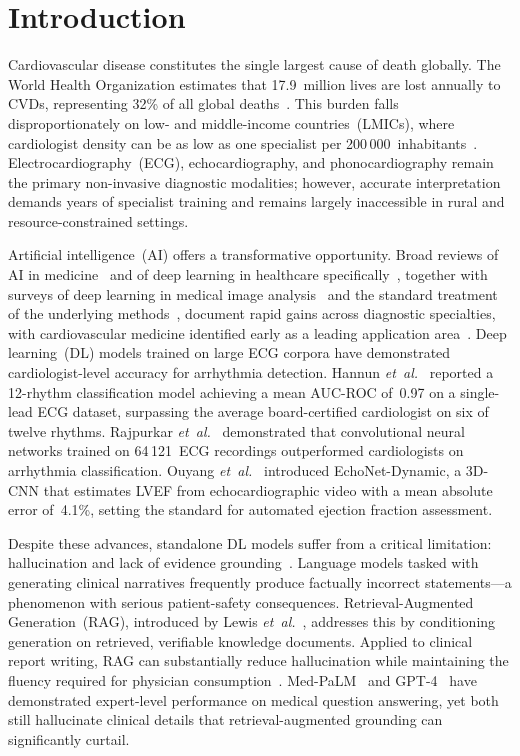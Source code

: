 \documentclass[AMA,STIX1COL,]{WileyNJD-v2}
\begin{document}
\section{Introduction}
\label{sec:intro}

Cardiovascular disease constitutes the single largest cause of death
globally. The World Health Organization estimates that
17.9~million lives are lost annually to CVDs, representing 32\% of all
global deaths~\cite{who2021}. This burden falls disproportionately on
low- and middle-income countries~(LMICs), where cardiologist density
can be as low as one specialist per 200\,000~inhabitants~\cite{watkins2018}.
Electrocardiography~(ECG), echocardiography, and phonocardiography
remain the primary non-invasive diagnostic modalities; however,
accurate interpretation demands years of specialist training and
remains largely inaccessible in rural and resource-constrained settings.

Artificial intelligence~(AI) offers a transformative opportunity.
Broad reviews of AI in medicine~\cite{topol2019,rajpurkar2022} and of
deep learning in healthcare specifically~\cite{esteva2019}, together with
surveys of deep learning in medical image
analysis~\cite{litjens2017,shen2017} and the standard treatment of the
underlying methods~\cite{goodfellow2016}, document
rapid gains across diagnostic specialties, with cardiovascular medicine
identified early as a leading application area~\cite{krittanawong2017}.
Deep learning~(DL) models trained on large ECG corpora have demonstrated
cardiologist-level accuracy for arrhythmia detection. Hannun
\emph{et~al.}~\cite{hannun2019} reported a 12-rhythm classification
model achieving a mean AUC-ROC of~0.97 on a single-lead ECG dataset,
surpassing the average board-certified cardiologist on six of twelve
rhythms. Rajpurkar \emph{et~al.}~\cite{rajpurkar2017} demonstrated
that convolutional neural networks trained on 64\,121~ECG recordings
outperformed cardiologists on arrhythmia classification. Ouyang
\emph{et~al.}~\cite{ouyang2020} introduced EchoNet-Dynamic, a 3D-CNN
that estimates LVEF from echocardiographic video with a mean absolute
error of~4.1\%, setting the standard for automated ejection fraction
assessment.

Despite these advances, standalone DL models suffer from a critical
limitation: hallucination and lack of evidence grounding~\cite{ji2023}.
Language models tasked with generating clinical narratives frequently
produce factually incorrect statements---a phenomenon with serious
patient-safety consequences. Retrieval-Augmented Generation~(RAG),
introduced by Lewis \emph{et~al.}~\cite{lewis2020}, addresses this by
conditioning generation on retrieved, verifiable knowledge documents.
Applied to clinical report writing, RAG can substantially reduce
hallucination while maintaining the fluency required for physician
consumption~\cite{chatdoctor2023}. Med-PaLM~\cite{singhal2023} and
GPT-4~\cite{nori2023} have demonstrated expert-level performance on
medical question answering, yet both still hallucinate clinical details
that retrieval-augmented grounding can significantly curtail.
\end{document}
